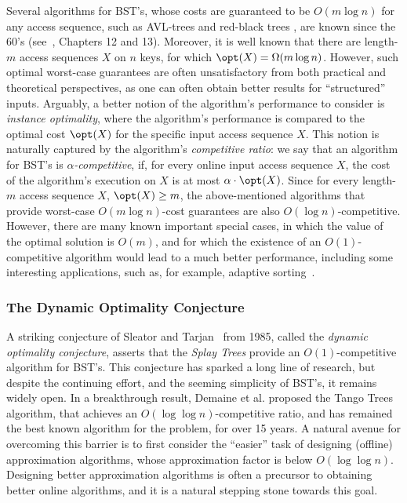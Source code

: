 \documentclass[11pt]{article}
\numberwithin{equation}{section}
\theoremstyle{definition}
\theoremstyle{plain}
\begin{document}
Several algorithms for BST's, whose costs are guaranteed to be $O(m\log n)$ for any access sequence, such as AVL-trees \cite{avl} and red-black trees \cite{Bayer1972}, are known since the 60's (see~\cite{cormen2022introduction}, Chapters 12 and 13). Moreover, it is well known that there are length-$m$ access sequences $X$ on $n$ keys, for which $\opt(X)=\Omega(m\log n)$.
However, such optimal worst-case  guarantees are often unsatisfactory from both practical and theoretical perspectives, as one can often obtain better results for ``structured'' inputs. 
Arguably, a better notion of the algorithm's performance to consider is \emph{instance optimality}, where the algorithm's performance is compared to the optimal cost $\opt(X)$ for the specific input access sequence $X$. This notion is naturally captured by the algorithm's \emph{competitive ratio}:  
%
we say that an algorithm for BST's is \emph{$\alpha$-competitive}, if, for every online input access sequence
$X$, the cost of the algorithm's execution on $X$ is at most $\alpha \cdot \opt(X)$.
Since for every length-$m$ access sequence $X$, $\opt(X)\geq m$, the above-mentioned algorithms that provide worst-case $O(m\log n)$-cost guarantees are also $O(\log n)$-competitive. 
However, there are many known important special cases, in which the value of the optimal solution is $O(m)$, and for which the existence of an $O(1)$-competitive algorithm would lead to a much better performance, including some interesting applications, such as, for example, adaptive sorting~\cite{Tar85,chaudhuri,split_Luc91,deque_Sun92,deque_Elm04,deque_Pet08,DS09,finger1,finger2,BoseDIL14,FOCS15,our_wads,IL-lazy}. 


\subsubsection{The Dynamic Optimality Conjecture} 

A striking conjecture of Sleator and Tarjan~\cite{ST85} from 1985, called the \emph{dynamic optimality conjecture}, asserts that the \emph{Splay Trees} provide an $O(1)$-competitive algorithm for BST's. 
This conjecture has sparked a long line of research, but despite the continuing effort, and the seeming simplicity of BST's, it remains widely open.
In a breakthrough result, Demaine et al. \cite{tango} proposed the Tango Trees algorithm, that achieves an $O(\log\log n)$-competitive ratio, and has remained the best known algorithm for the problem, for over 15 years.   
A natural avenue for overcoming this barrier is to first consider the ``easier'' task of designing (offline) approximation algorithms, whose approximation factor is below $O(\log \log n)$. Designing better approximation algorithms is often a precursor to obtaining better online algorithms, and it is a natural stepping stone towards this goal.  
\end{document}
